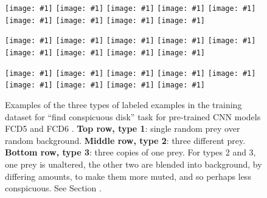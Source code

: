 \documentclass[letterpaper]{article}
\newcommand{\ignine}[1]{\texttt{[image: \#1]}}
\begin{document}


\begin{figure}[t]
    \begin{minipage}{\linewidth}
    \ignine{20220303_UVSfqCzewt_38_20.png}
    \hfill
    \ignine{20220303_SBWaLRHOzk_56_33.png}
    \hfill
    \ignine{20220303_bUMqcbutgJ_25_78.png}
    \hfill
    \ignine{20220303_HZzUzWWqcC_54_28.png}
    \hfill
    \ignine{20220303_inuPKUxnHQ_72_71.png}
    \hfill
    \ignine{20220303_RRGCwhmcJc_101_84.png}
    \hfill
    \ignine{20220303_PYinyJAWaj_61_60.png}
    \hfill
    \ignine{20220303_TNXfhQtzYa_92_91.png}
    \hfill
    \ignine{20220303_cDMtFaTYKk_63_54.png}
    \end{minipage}
    \begin{minipage}{\linewidth}
    \vspace{0.1cm}
    \ignine{20220303_wIRPERwSCh_49_63.png}
    \hfill
    \ignine{20220303_edDsCjbHdf_61_92.png}
    \hfill
    \ignine{20220303_fGMFBgMQDX_93_86.png}
    \hfill
    \ignine{20220303_jQREPLQyuL_33_39.png}
    \hfill
    \ignine{20220303_ijBOHTccYX_104_101.png}
    \hfill
    \ignine{20220303_KAoOFAqFyU_80_58.png}
    \hfill
    \ignine{20220303_NExMwxEbzU_85_92.png}
    \hfill
    \ignine{20220303_kpcUyhHXOh_91_98.png}
    \hfill
    \ignine{20220303_oWPwPGkcSb_82_22.png}
    \end{minipage}
    \begin{minipage}{\linewidth}
    \vspace{0.1cm}
    \ignine{20220303_uAEPxMZbeo_83_45.png}
    \hfill
    \ignine{20220303_cADfBauZUV_47_32.png}
    \hfill
    \ignine{20220303_YAMfudJxeH_30_84.png}
    \hfill
    \ignine{20220303_JeyBgDfMcN_40_82.png}
    \hfill
    \ignine{20220303_OaOJaByhbU_90_55.png}
    \hfill
    \ignine{20220303_mhYpDjxaKf_78_57.png}
    \hfill
    \ignine{20220303_ASsEgFUlly_23_60.png}
    \hfill
    \ignine{20220303_nzgItDrYqT_71_99.png}
    \hfill
    \ignine{20220303_QuHYtnPora_72_73.png}
    \end{minipage}
    \caption{Examples of the three types of labeled examples in the training dataset for ``find conspicuous disk'' task for  pre-trained CNN models FCD5 and FCD6 \citep{reynolds_FCD6_2022}. \textbf{Top row, type 1}: single random prey over random background. \textbf{Middle row, type 2}: three different prey. \textbf{Bottom row, type 3}: three copies of one prey. For types 2 and 3, one prey is unaltered, the other two are blended into background, by differing amounts, to make them more muted, and so perhaps less conspicuous. See Section .}
    \label{fig:fcd5_examples}
\end{figure}
\end{document}
